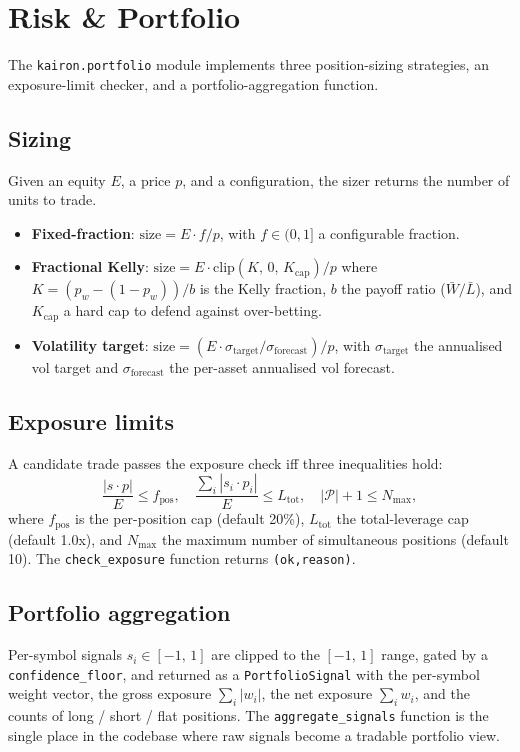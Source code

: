 \documentclass[11pt,a4paper]{article}
\let\oldsection\section
\renewcommand{\section}{\clearpage\oldsection}
\begin{document}
\section{Risk \& Portfolio}\label{sec:risk}

The \texttt{kairon.portfolio} module implements three
position-sizing strategies, an exposure-limit checker, and a
portfolio-aggregation function.

\subsection{Sizing}
Given an equity $E$, a price $p$, and a configuration, the
sizer returns the number of units to trade.
\begin{itemize}[leftmargin=1.2em,itemsep=0.05em,topsep=0.1em]
    \item \textbf{Fixed-fraction}: $\mathrm{size} = E\cdot f/p$,
    with $f\in(0,1]$ a configurable fraction.
    \item \textbf{Fractional Kelly}: $\mathrm{size} = E\cdot
    \mathrm{clip}(K,\,0,\,K_{\mathrm{cap}})/p$ where
    $K = (p_w - (1-p_w))/b$ is the Kelly fraction, $b$ the
    payoff ratio ($\bar W / \bar L$), and $K_{\mathrm{cap}}$
    a hard cap to defend against over-betting.
    \item \textbf{Volatility target}:
    $\mathrm{size} = (E\cdot \sigma_{\mathrm{target}}/\sigma_{\mathrm{forecast}})/p$,
    with $\sigma_{\mathrm{target}}$ the annualised vol target
    and $\sigma_{\mathrm{forecast}}$ the per-asset annualised
    vol forecast.
\end{itemize}

\subsection{Exposure limits}
A candidate trade passes the exposure check iff three
inequalities hold:
\[
\frac{|s\cdot p|}{E}\leq f_{\mathrm{pos}},\quad
\frac{\sum_i |s_i\cdot p_i|}{E}\leq L_{\mathrm{tot}},\quad
|\mathcal{P}|+1\leq N_{\mathrm{max}},
\]
where $f_{\mathrm{pos}}$ is the per-position cap (default
20\%), $L_{\mathrm{tot}}$ the total-leverage cap (default
1.0x), and $N_{\mathrm{max}}$ the maximum number of
simultaneous positions (default 10). The
\texttt{check\_exposure} function returns
\texttt{(ok,\;reason)}.

\subsection{Portfolio aggregation}
Per-symbol signals $s_i\in[-1,\,1]$ are clipped to the
$[-1,\,1]$ range, gated by a \texttt{confidence\_floor}, and
returned as a \texttt{PortfolioSignal} with the per-symbol
weight vector, the gross exposure
$\sum_i |w_i|$, the net exposure $\sum_i w_i$, and the
counts of long / short / flat positions. The
\texttt{aggregate\_signals} function is the single place in
the codebase where raw signals become a tradable
portfolio view.
\end{document}

